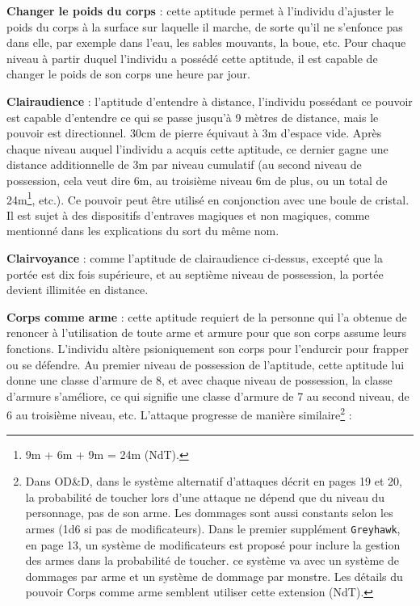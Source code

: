 \documentclass[11pt]{article}
\begin{document}
{\textbf{Changer le poids du corps} : cette aptitude permet à l'individu d'ajuster le poids du corps à la surface sur laquelle il marche, de sorte qu'il ne s'enfonce pas dans elle, par exemple dans l'eau, les sables mouvants, la boue, etc. Pour chaque niveau à partir duquel l'individu a possédé cette aptitude, il est capable de changer le poids de son corps une heure par jour.

\bigskip

\textbf{Clairaudience} : l'aptitude d'entendre à distance, l'individu possédant ce pouvoir est capable d'entendre ce qui se passe jusqu'à 9 mètres de distance, mais le pouvoir est directionnel. 30cm de pierre équivaut à 3m d'espace vide. Après chaque niveau auquel l'individu a acquis cette aptitude, ce dernier gagne une distance additionnelle de 3m par niveau cumulatif (au second niveau de possession, cela veut dire 6m, au troisième niveau 6m de plus, ou un total de 24m\footnote{9m + 6m + 9m = 24m (NdT).}, etc.). Ce pouvoir peut être utilisé en conjonction avec une boule de cristal. Il est sujet à des dispositifs d'entraves magiques et non magiques, comme mentionné dans les explications du sort du même nom.

\bigskip

\textbf{Clairvoyance} : comme l'aptitude de clairaudience ci-dessus, excepté que la portée est dix fois supérieure, et au septième niveau de possession, la portée devient illimitée en distance.

\bigskip

\textbf{Corps comme arme} : cette aptitude requiert de la personne qui l'a obtenue de renoncer à l'utilisation de toute arme et armure pour que son corps assume leurs fonctions. L'individu altère psioniquement son corps pour l'endurcir pour frapper ou se défendre. Au premier niveau de possession de l'aptitude, cette aptitude lui donne une classe d'armure de 8, et avec chaque niveau de possession, la classe d'armure s'améliore, ce qui signifie une classe d'armure de 7 au second niveau, de 6 au troisième niveau, etc. L'attaque progresse de manière similaire\footnote{Dans OD\&D, dans le système alternatif d'attaques décrit en pages 19 et 20, la probabilité de toucher lors d'une attaque ne dépend que du niveau du personnage, pas de son arme. Les dommages sont aussi constants selon les armes (1d6 si pas de modificateurs). Dans le premier supplément \texttt{Greyhawk}, en page 13, un système de modificateurs est proposé pour inclure la gestion des armes dans la probabilité de toucher. ce système va avec un système de dommages par arme et un système de dommage par monstre. Les détails du pouvoir Corps comme arme semblent utiliser cette extension (NdT). } :

}
\end{document}
